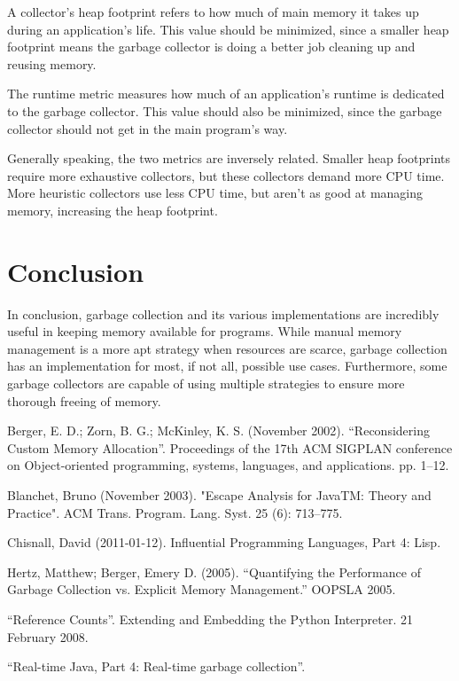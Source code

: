 \documentclass[12pt]{article}
\begin{document}
A collector's heap footprint refers to how much of main memory it takes up during an application's life. This value should be minimized, since a smaller heap footprint means the garbage collector is doing a better job cleaning up and reusing memory.

The runtime metric measures how much of an application's runtime is dedicated to the garbage collector. This value should also be minimized, since the garbage collector should not get in the main program's way.

Generally speaking, the two metrics are inversely related. Smaller heap footprints require more exhaustive collectors, but these collectors demand more CPU time. More heuristic collectors use less CPU time, but aren't as good at managing memory, increasing the heap footprint. \cite{ref5}
\section{Conclusion}
In conclusion, garbage collection and its various implementations are incredibly useful in keeping memory available for programs. While manual memory management is a more apt strategy when resources are scarce, garbage collection has an implementation for most, if not all, possible use cases. Furthermore, some garbage collectors are capable of using multiple strategies to ensure more thorough freeing of memory.
\newpage

\begin{thebibliography}{}
  Berger, E. D.; Zorn, B. G.; McKinley, K. S. (November 2002). ``Reconsidering Custom Memory Allocation''. Proceedings of the 17th ACM SIGPLAN conference on Object-oriented programming, systems, languages, and applications. pp. 1–12.

  Blanchet, Bruno (November 2003). "Escape Analysis for JavaTM: Theory and Practice". ACM Trans. Program. Lang. Syst. 25 (6): 713–775.
  
  Chisnall, David (2011-01-12). Influential Programming Languages, Part 4: Lisp.
  
  Hertz, Matthew; Berger, Emery D. (2005). ``Quantifying the Performance of Garbage Collection vs. Explicit Memory Management.'' OOPSLA 2005.

  ``Reference Counts''. Extending and Embedding the Python Interpreter. 21 February 2008.

  ``Real-time Java, Part 4: Real-time garbage collection''.

\end{thebibliography}
\end{document}
